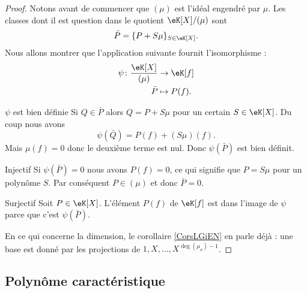 \begin{proof}
    Notons avant de commencer que \( (\mu)\) est l'idéal engendré par \( \mu\). Les classes dont il est question dans le quotient \( \eK[X]/(\mu)\) sont 
    \begin{equation}
        \bar P=\{ P+S\mu \}_{S\in \eK[X]}.
    \end{equation}
    Nous allons montrer que l'application suivante fournit l'isomorphisme : 
    \begin{equation}
        \begin{aligned}
            \psi\colon \frac{ \eK[X] }{ (\mu) }&\to \eK[f] \\
            \bar P&\mapsto P(f). 
        \end{aligned}
    \end{equation}
    \begin{subproof}
        \item[\( \psi\) est bien définie]
            Si \( Q\in \bar P\) alors \( Q=P+S\mu\) pour un certain \( S\in \eK[X]\). Du coup nous avons
            \begin{equation}
                \psi(\bar Q)=P(f)+(S\mu)(f).
            \end{equation}
            Mais \( \mu(f)=0\) donc le deuxième terme est nul. Donc \( \psi(\bar P)\) est bien définit.
        \item[Injectif]
            Si \( \psi(\bar P)=0\) nous avons \( P(f)=0\), ce qui signifie que \( P=S\mu\) pour un polynôme \( S\). Par conséquent \( P\in (\mu)\) et donc \( \bar P=0\).
        \item[Surjectif]
            Soit \( P\in \eK[X]\). L'élément \( P(f) \) de \( \eK[f]\) est dans l'image de \( \psi\) parce que c'est \( \psi(\bar P)\).
    \end{subproof}
    En ce qui concerne la dimension, le corollaire \ref{CorsLGiEN} en parle déjà : une base est donné par les projections de \( 1,X,\ldots, X^{\deg(\mu_a)-1}\).
\end{proof}

\subsection{Polynôme caractéristique}

